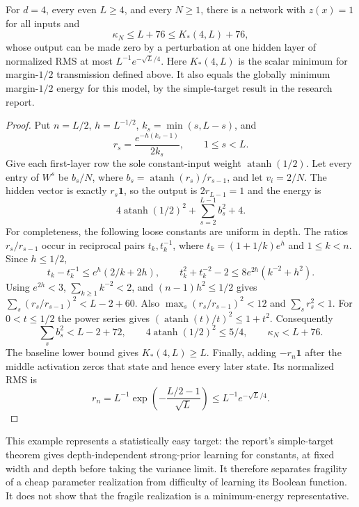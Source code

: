 \begin{proposition}
For $d=4$, every even $L\ge4$, and every $N\ge1$, there is a network with
$z(x)=1$ for all inputs and
\[
 \kappa_N\le L+76\le K_*(4,L)+76,
\]
whose output can be made zero by a perturbation at one hidden layer of
normalized RMS at most $L^{-1}e^{-\sqrt L/4}$.
Here $K_*(4,L)$ is the scalar minimum for margin-$1/2$ transmission
defined above. It also equals the globally minimum margin-$1/2$ energy
for this model, by the simple-target result in the research report.
\end{proposition}

\begin{proof}
Put $n=L/2$, $h=L^{-1/2}$, $k_s=\min(s,L-s)$, and
\[
 r_s=\frac{e^{-h(k_s-1)}}{2k_s},\qquad 1\le s<L.
\]
Give each first-layer row the sole constant-input weight
$\operatorname{atanh}(1/2)$. Let every entry of $W^s$ be $b_s/N$, where
$b_s=\operatorname{atanh}(r_s)/r_{s-1}$, and let $v_i=2/N$.
The hidden vector is exactly $r_s\mathbf1$, so the output is
$2r_{L-1}=1$ and the energy is
\[
 4\operatorname{atanh}(1/2)^2+\sum_{s=2}^{L-1}b_s^2+4.
\]
For completeness, the following loose constants are uniform in depth.
The ratios $r_s/r_{s-1}$ occur in reciprocal pairs $t_k,t_k^{-1}$,
where $t_k=(1+1/k)e^h$ and $1\le k<n$. Since $h\le1/2$,
\[
 t_k-t_k^{-1}\le e^h(2/k+2h),\qquad
 t_k^2+t_k^{-2}-2\le8e^{2h}(k^{-2}+h^2).
\]
Using $e^{2h}<3$, $\sum_{k\ge1}k^{-2}<2$, and $(n-1)h^2\le1/2$ gives
$\sum_s(r_s/r_{s-1})^2<L-2+60$.
Also $\max_s(r_s/r_{s-1})^2<12$ and $\sum_s r_s^2<1$.
For $0<t\le1/2$ the power series gives
$(\operatorname{atanh}(t)/t)^2\le1+t^2$. Consequently
\[
 \sum_s b_s^2<L-2+72,
 \qquad 4\operatorname{atanh}(1/2)^2\le5/4,
 \qquad \kappa_N<L+76.
\]
The baseline lower bound gives $K_*(4,L)\ge L$.
Finally, adding $-r_n\mathbf1$ after the middle activation zeros that
state and hence every later state. Its normalized RMS is
\[
 r_n=L^{-1}\exp\!\left(-\frac{L/2-1}{\sqrt L}\right)
 \le L^{-1}e^{-\sqrt L/4}.
\]
\end{proof}

This example represents a statistically easy target: the report's
simple-target theorem gives depth-independent strong-prior learning
for constants, at fixed width and depth before taking the variance limit. It therefore
separates fragility of a cheap parameter realization from difficulty of
learning its Boolean function. It does not show that the fragile realization
is a minimum-energy representative.

